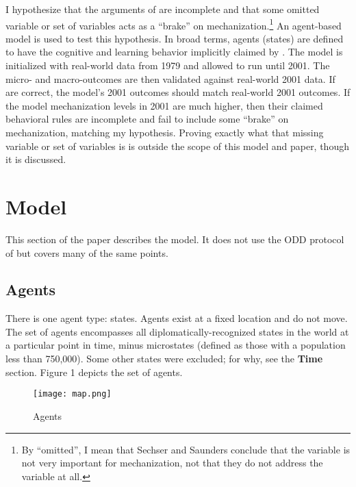 \documentclass{article}
\begin{document}
I hypothesize that the arguments of \citet{sechser2010army} are incomplete and
that some omitted variable or set of variables acts as a ``brake'' on 
mechanization.\footnote{By ``omitted'', I mean that Sechser and Saunders conclude that the variable
is not very important for mechanization, not that they do not address the
variable at all.} An agent-based model is used to test this hypothesis. In broad
terms, agents (states) are defined to have the cognitive and learning behavior
implicitly claimed by \citet{sechser2010army}. The model is initialized with
real-world data from 1979 and allowed to run until 2001. The micro- and
macro-outcomes are then validated against real-world 2001 data. If
\citet{sechser2010army} are correct, the model's 2001 outcomes should match
real-world 2001 outcomes. If the model mechanization levels in 2001 are much
higher, then their claimed behavioral rules are incomplete and fail to include
some ``brake'' on mechanization, matching my hypothesis. Proving exactly what
that missing variable or set of variables is is outside the scope of this model
and paper, though it is discussed.

\section{Model}

This section of the paper describes the model. It does not use the ODD protocol
of \citet{grimm2006standard} but covers many of the same points.

\subsection{Agents}

There is one agent type: states. Agents exist at a fixed location and do not
move. The set of agents encompasses all diplomatically-recognized 
states in the world at a particular point in time, minus microstates (defined as
those with a population less than 750,000). Some other states were excluded; for
why, see the \textbf{Time}
section. Figure 1 depicts the set of agents.

\begin{figure}[h!]
	\centering
	\caption{Agents}
\texttt{[image: map.png]}
\end{figure}
\end{document}
